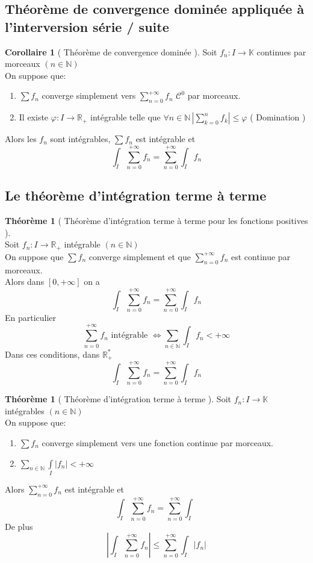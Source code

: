 \documentclass[10pt,a4paper]{article}
\theoremstyle{definition}
\newtheorem{theorem}[proposition]{Théorème}
\newtheorem{corollary}[proposition]{Corollaire}
\begin{document}
\subsection{Théorème de convergence dominée appliquée à l'interversion série / suite}
\begin{corollary}[ Théorème de convergence dominée ]
    Soit \(f_n: I \to \mathbb{K}\) continues par morceaux \((n \in \mathbb{N})\) \\
    On suppose que:
    \begin{enumerate}
        \item \(\sum f_n\) converge simplement vers \(\sum\limits_{n = 0}^{+\infty} f_n\) \(\mathcal{C}^0\) par morceaux.
        \item Il existe \(\varphi: I \to \mathbb{R}_+\) intégrable telle que \(\forall n \in \mathbb{N}\, \left| \sum\limits_{k = 0}^{n} f_k \right| \leq \varphi\) ( Domination )
    \end{enumerate}
    Alors les \(f_n\) sont intégrables, \(\sum f_n\) est intégrable et
    \[\boxed{\int_{I} \sum_{n = 0}^{+\infty} f_n = \sum_{n = 0}^{+\infty}\int_{I} f_n}\]
\end{corollary}

\subsection{Le théorème d'intégration terme à terme}
\begin{theorem}[ Théorème d'intégration terme à terme pour les fonctions positives ]
    \hfill \\
    Soit \(f_n: I \to \mathbb{R}_+\) intégrable \((n \in \mathbb{N})\) \\
    On suppose que \(\sum f_n\) converge simplement et que \(\sum\limits_{n = 0}^{+\infty} f_n\) est continue par morceaux. \\
    Alors dans \([0, +\infty]\) on a
    \[\int_{I}\sum_{n = 0}^{+\infty}f_n = \sum_{n = 0}^{+\infty} \int_{I} f_n\]
    En particulier
    \[\sum_{n = 0}^{+\infty} f_n \text{ intégrable } \iff \sum_{n \in \mathbb{N}} \int_{I} f_n < +\infty\]
    Dans ces conditions, dans \(\mathbb{R}_+^*\)
    \[\int_{I}\sum_{n = 0}^{+\infty}f_n = \sum_{n = 0}^{+\infty} \int_{I} f_n\]
\end{theorem}
\begin{theorem}[ Théorème d'intégration terme à terme ]
    Soit \(f_n: I \to \mathbb{K}\) intégrables \((n \in \mathbb{N})\) \\
    On suppose que:
    \begin{enumerate}
        \item \(\sum f_n\) converge simplement vers une fonction continue par morceaux.
        \item \(\sum\limits_{n \in \mathbb{N}}\int\limits_{I}|f_n| < +\infty\)
    \end{enumerate}
    Alors \(\sum\limits_{n = 0}^{+\infty} f_n\) est intégrable et
    \[\boxed{\int_{I}\sum_{n = 0}^{+\infty}f_n = \sum_{n = 0}^{+\infty}\int_{I}}\]
    De plus
    \[\left| \int_{I}\sum_{n = 0}^{+\infty}f_n \right| \leq \sum_{n = 0}^{+\infty} \int_{I}|f_n|\]
\end{theorem}
\end{document}
